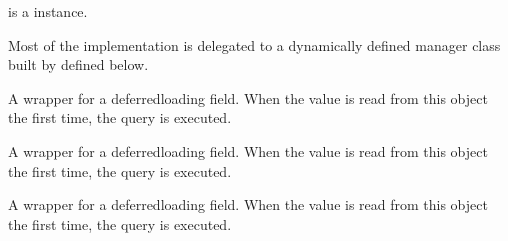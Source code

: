 \documentclass[letterpaper,10pt,english]{sphinxmanual}
\begin{document}
\begin{fulllineitems}
\begin{fulllineitems}
\sphinxAtStartPar
{} is a  instance.

\sphinxAtStartPar
Most of the implementation is delegated to a dynamically defined manager
class built by  defined below.

\end{fulllineitems}


\begin{fulllineitems}
\label{\detokenize{app:app.models.connecteur.dimension_column}}
\pysigstartsignatures
{}
\pysigstopsignatures
\sphinxAtStartPar
A wrapper for a deferred\sphinxhyphen{}loading field. When the value is read from this
object the first time, the query is executed.

\end{fulllineitems}


\begin{fulllineitems}
\label{\detokenize{app:app.models.connecteur.dimension_row}}
\pysigstartsignatures
{}
\pysigstopsignatures
\sphinxAtStartPar
A wrapper for a deferred\sphinxhyphen{}loading field. When the value is read from this
object the first time, the query is executed.

\end{fulllineitems}


\begin{fulllineitems}
\label{\detokenize{app:app.models.connecteur.id}}
\pysigstartsignatures
{}
\pysigstopsignatures
\sphinxAtStartPar
A wrapper for a deferred\sphinxhyphen{}loading field. When the value is read from this
object the first time, the query is executed.

\end{fulllineitems}



\end{fulllineitems}
\end{document}
